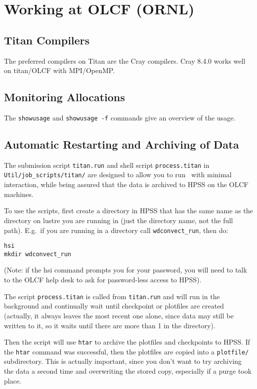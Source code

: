 \section{Working at OLCF (ORNL)}

\subsection{Titan Compilers}

The preferred compilers on Titan are the Cray compilers.  
Cray 8.4.0 works well on titan/OLCF with MPI/OpenMP.


\subsection{Monitoring Allocations}

The {\tt showusage} and {\tt showusage -f} commands give an
overview of the usage.

\subsection{Automatic Restarting and Archiving of Data}

The submission script {\tt titan.run} and shell script
{\tt process.titan} in {\tt Util/job\_scripts/titan/}
are designed to allow you to run \maestro\ with minimal interaction,
while being assured that the data is archived to HPSS on the OLCF
machines.

To use the scripts, first create a directory in HPSS that has the same
name as the directory on lustre you are running in (just the directory
name, not the full path).  E.g.\ if you are running in a directory
call {\tt wdconvect\_run}, then do:
\begin{verbatim}
hsi
mkdir wdconvect_run
\end{verbatim}
(Note: if the hsi command prompts you for your password, you will need
to talk to the OLCF help desk to ask for password-less access to
HPSS).

The script {\tt process.titan} is called from {\tt titan.run} and will
run in the background and continually wait until checkpoint or
plotfiles are created (actually, it always leaves the most recent one
alone, since data may still be written to it, so it waits until there
are more than 1 in the directory).

Then the script will use {\tt htar} to archive the plotfiles and
checkpoints to HPSS.  If the {\tt htar} command was successful, then
the plotfiles are copied into a {\tt plotfile/} subdirectory.  This is
actually important, since you don't want to try archiving the data a
second time and overwriting the stored copy, especially if a purge
took place.

